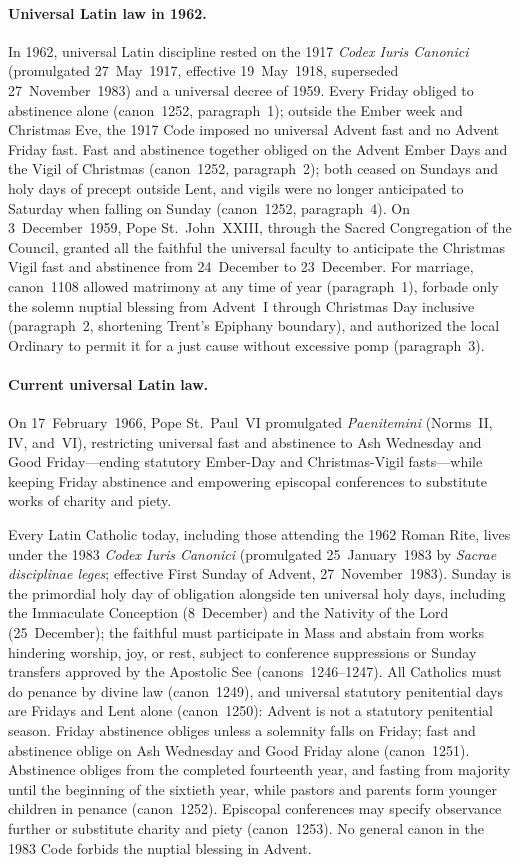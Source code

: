 \paragraph{Universal Latin law in 1962.}
In 1962, universal Latin discipline rested on the 1917 \textit{Codex Iuris Canonici} (promulgated 27~May~1917, effective 19~May~1918, superseded 27~November~1983) and a universal decree of 1959. Every Friday obliged to abstinence alone (canon~1252, paragraph~1); outside the Ember week and Christmas Eve, the 1917 Code imposed no universal Advent fast and no Advent Friday fast. Fast and abstinence together obliged on the Advent Ember Days and the Vigil of Christmas (canon~1252, paragraph~2); both ceased on Sundays and holy days of precept outside Lent, and vigils were no longer anticipated to Saturday when falling on Sunday (canon~1252, paragraph~4). On 3~December~1959, Pope St.~John~XXIII, through the Sacred Congregation of the Council, granted all the faithful the universal faculty to anticipate the Christmas Vigil fast and abstinence from 24~December to 23~December. For marriage, canon~1108 allowed matrimony at any time of year (paragraph~1), forbade only the solemn nuptial blessing from Advent~I through Christmas Day inclusive (paragraph~2, shortening Trent's Epiphany boundary), and authorized the local Ordinary to permit it for a just cause without excessive pomp (paragraph~3).

\paragraph{Current universal Latin law.}
On 17~February~1966, Pope St.~Paul~VI promulgated \textit{Paenitemini} (Norms~II, IV, and~VI), restricting universal fast and abstinence to Ash Wednesday and Good Friday---ending statutory Ember-Day and Christmas-Vigil fasts---while keeping Friday abstinence and empowering episcopal conferences to substitute works of charity and piety.

Every Latin Catholic today, including those attending the 1962 Roman Rite, lives under the 1983 \textit{Codex Iuris Canonici} (promulgated 25~January~1983 by \textit{Sacrae disciplinae leges}; effective First Sunday of Advent, 27~November~1983). Sunday is the primordial holy day of obligation alongside ten universal holy days, including the Immaculate Conception (8~December) and the Nativity of the Lord (25~December); the faithful must participate in Mass and abstain from works hindering worship, joy, or rest, subject to conference suppressions or Sunday transfers approved by the Apostolic See (canons~1246--1247). All Catholics must do penance by divine law (canon~1249), and universal statutory penitential days are Fridays and Lent alone (canon~1250): Advent is not a statutory penitential season. Friday abstinence obliges unless a solemnity falls on Friday; fast and abstinence oblige on Ash Wednesday and Good Friday alone (canon~1251). Abstinence obliges from the completed fourteenth year, and fasting from majority until the beginning of the sixtieth year, while pastors and parents form younger children in penance (canon~1252). Episcopal conferences may specify observance further or substitute charity and piety (canon~1253). No general canon in the 1983 Code forbids the nuptial blessing in Advent.

